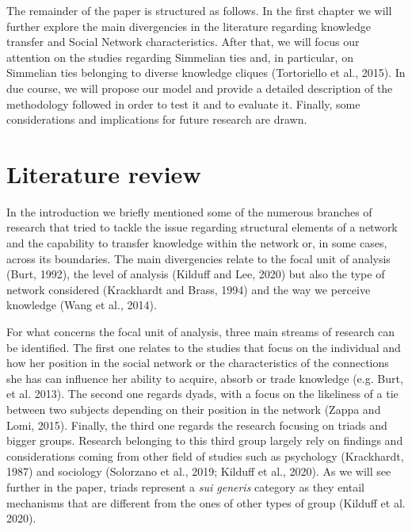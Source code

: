\documentclass{article}
\begin{document}
The remainder of the paper is structured as follows. In the first chapter we will further explore the main divergencies in the literature regarding knowledge transfer and Social Network characteristics. After that, we will focus our attention on the studies regarding Simmelian ties and, in particular, on Simmelian ties belonging to diverse knowledge cliques (Tortoriello et al., 2015). In due course, we will propose our model and provide a detailed description of the methodology followed in order to test it and to evaluate it.
Finally, some considerations and implications for future research are drawn.


\newpage
\section{Literature review}
In the introduction we briefly mentioned some of the numerous branches of research that tried to tackle the issue regarding structural elements of a network and the capability to transfer knowledge within the network or, in some cases, across its boundaries. The main divergencies relate to the focal unit of analysis (Burt, 1992), the level of analysis (Kilduff and Lee, 2020) but also the type of network considered (Krackhardt and Brass, 1994) and the way we perceive knowledge (Wang et al., 2014).

For what concerns the focal unit of analysis, three main streams of research can be identified. The first one relates to the studies that focus on the individual and how her position in the social network or the characteristics of the connections she has can influence her ability to acquire, absorb or trade knowledge (e.g. Burt, et al. 2013). The second one regards dyads, with a focus on the likeliness of a tie between two subjects depending on their position in the network (Zappa and Lomi, 2015). Finally, the third one regards the research focusing on triads and bigger groups. Research belonging to this third group largely rely on findings and considerations coming from other field of studies such as psychology (Krackhardt, 1987) and sociology (Solorzano et al., 2019; Kilduff et al., 2020). As we will see further in the paper, triads represent a \emph{sui generis} category as they entail mechanisms that are different from the ones of other types of group (Kilduff et al. 2020).
\end{document}

